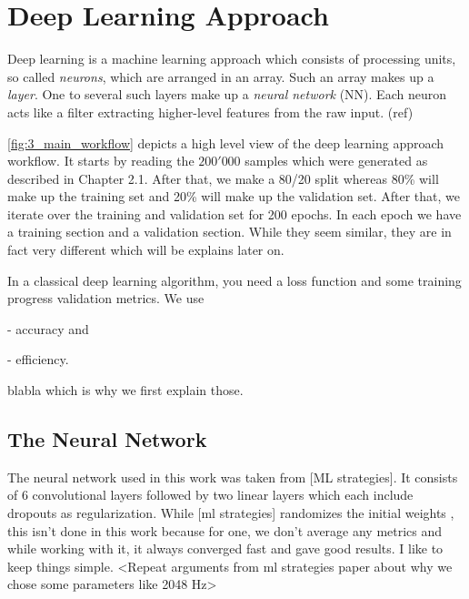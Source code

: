 
\section{Deep Learning Approach}

Deep learning is a machine learning approach which consists of processing
units, so called \textit{neurons}, which are arranged in an array. Such an array 
makes up a \textit{layer}. One to several such layers make up a
\textit{neural network} (NN). Each neuron
acts like a filter extracting higher-level features from the raw input. (ref)

\autoref{fig:3_main_workflow} depicts a high level view of the deep learning approach workflow.
It starts by reading the $200'000$ samples which were generated as described in
Chapter 2.1. After that, we make a 80/20 split whereas 80\% will make up the
training set and 20\% will make up the validation set.
After that, we iterate over the training and validation set for 200 epochs. In
each epoch we have a training section and a validation section. While they seem
similar, they are in fact very different which will be explains later on.

In a classical deep learning algorithm, you need a loss function and some
training progress validation metrics. We use

- accuracy and

- efficiency.

blabla which is why we first explain those.




\newpage

\subsection{The Neural Network}
The neural network used in this work was taken from [ML strategies]. It consists
of 6 convolutional layers followed by two linear layers which each include
dropouts as regularization. While [ml strategies] randomizes the initial weights
, this isn't done in this work because for one, we don't average any metrics and
while working with it, it always converged fast and gave good results. I like to
keep things simple. <Repeat arguments from ml strategies paper about why we
chose some parameters like 2048 Hz>

